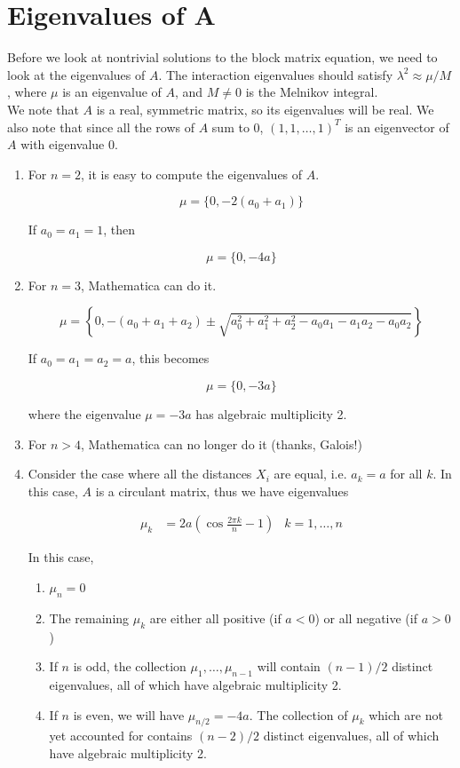 \documentclass[12pt]{article}
\begin{document}
\section{Eigenvalues of A}

Before we look at nontrivial solutions to the block matrix equation, we need to look at the eigenvalues of $A$. The interaction eigenvalues should satisfy $\lambda^2 \approx \mu / M$, where $\mu$ is an eigenvalue of $A$, and $M \neq 0$ is the Melnikov integral.\\

We note that $A$ is a real, symmetric matrix, so its eigenvalues will be real. We also note that since all the rows of $A$ sum to 0, $(1, 1, \dots, 1)^T$ is an eigenvector of $A$ with eigenvalue 0.

\begin{enumerate}

\item For $n = 2$, it is easy to compute the eigenvalues of $A$.

\[
\mu = \{ 0, -2(a_0 + a_1) \}
\]

If $a_0 = a_1 = 1$, then

\[
\mu = \{ 0, -4 a \}
\]

\item For $n = 3$, Mathematica can do it.

\[
\mu = \left\{0,  -(a_0 + a_1 + a_2) \pm 
\sqrt{ a_0^2 + a_1^2 + a_2^2 - a_0 a_1 - a_1 a_2 - a_0 a_2 }\right\}
\]

If $a_0 = a_1 = a_2 = a$, this becomes

\[
\mu = \{0,  -3a \}
\]

where the eigenvalue $\mu = -3a$ has algebraic multiplicity 2. 

\item For $n > 4$, Mathematica can no longer do it (thanks, Galois!) 

\item Consider the case where all the distances $X_i$ are equal, i.e. $a_k = a$ for all $k$. In this case, $A$ is a circulant matrix, thus we have eigenvalues

\begin{align*}
\mu_k &= 2 a\left( \cos \frac{2 \pi k}{n}  - 1 \right) & k = 1, \dots, n
\end{align*}

In this case,

\begin{enumerate}
	\item $\mu_n = 0$
	\item The remaining $\mu_k$ are either all positive (if $a < 0$) or all negative (if $a > 0$)
	\item If $n$ is odd, the collection $\mu_1, \dots, \mu_{n-1}$ will contain $(n-1)/2$ distinct eigenvalues, all of which have algebraic multiplicity 2.
	\item If $n$ is even, we will have $\mu_{n/2} = -4a$. The collection of $\mu_k$ which are not yet accounted for contains $(n-2)/2$ distinct eigenvalues, all of which have algebraic multiplicity 2.
\end{enumerate}

\end{enumerate}
\end{document}
